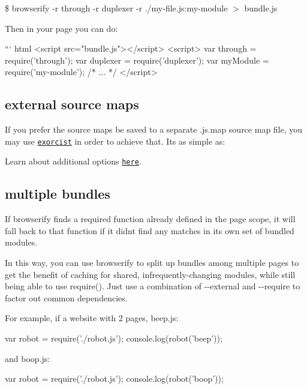  \$ browserify -\/r through -\/r duplexer -\/r ./my-\/file.js\+:my-\/module $>$ bundle.\+js 
\begin{DoxyCode}
Then in your page you can do:

``` html
<script src="bundle.js"></script>
<script>
  var through = require('through');
  var duplexer = require('duplexer');
  var myModule = require('my-module');
  /* ... */
</script>
\end{DoxyCode}


\subsection*{external source maps}

If you prefer the source maps be saved to a separate {\ttfamily .js.\+map} source map file, you may use \href{https://github.com/thlorenz/exorcist}{\tt exorcist} in order to achieve that. It\textquotesingle{}s as simple as\+:




Learn about additional options \href{https://github.com/thlorenz/exorcist#usage}{\tt here}.

\subsection*{multiple bundles}

If browserify finds a {\ttfamily require}d function already defined in the page scope, it will fall back to that function if it didn\textquotesingle{}t find any matches in its own set of bundled modules.

In this way, you can use browserify to split up bundles among multiple pages to get the benefit of caching for shared, infrequently-\/changing modules, while still being able to use {\ttfamily require()}. Just use a combination of {\ttfamily -\/-\/external} and {\ttfamily -\/-\/require} to factor out common dependencies.

For example, if a website with 2 pages, {\ttfamily beep.\+js}\+:


\begin{DoxyCode}
var robot = require('./robot.js');
console.log(robot('beep'));
\end{DoxyCode}


and {\ttfamily boop.\+js}\+:


\begin{DoxyCode}
var robot = require('./robot.js');
console.log(robot('boop'));
\end{DoxyCode}



